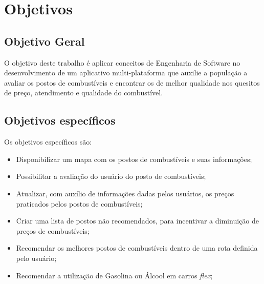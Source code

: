 \section{Objetivos}

\subsection{Objetivo Geral}

O objetivo deste trabalho é aplicar conceitos de Engenharia de Software no desenvolvimento de um aplicativo multi-plataforma que auxilie a população a avaliar os postos de combustíveis e encontrar os de melhor qualidade nos quesitos de preço, atendimento e qualidade do combustível.

\subsection{Objetivos específicos}

Os objetivos específicos são:
\begin{itemize}
    \item Disponibilizar um mapa com os postos de combustíveis e suas informações;
    \item Possibilitar a avaliação do usuário do posto de combustíveis;
    \item Atualizar, com auxílio de informações dadas pelos usuários, os preços praticados pelos postos de combustíveis;
    \item Criar uma lista de postos não recomendados, para incentivar a diminuição de preços de combustíveis;
    \item Recomendar os melhores postos de combustíveis dentro de uma rota definida pelo usuário;
    \item Recomendar a utilização de Gasolina ou Álcool em carros \textit{flex};
\end{itemize}
